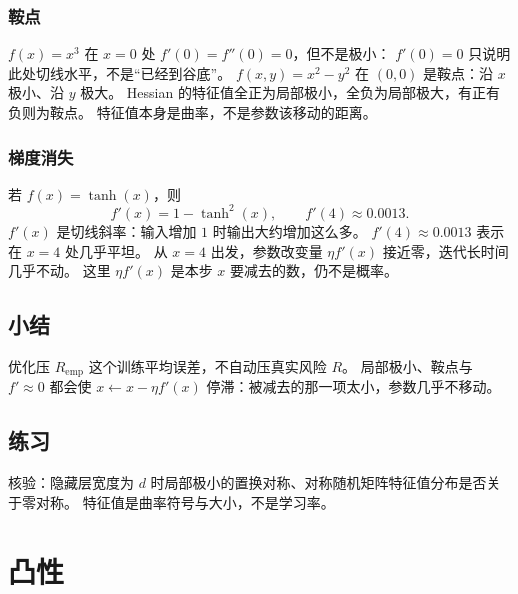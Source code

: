\subsubsection{鞍点}

$f(x)=x^3$ 在 $x=0$ 处 $f'(0)=f''(0)=0$，但不是极小：
$f'(0)=0$ 只说明此处切线水平，不是“已经到谷底”。
$f(x,y)=x^2-y^2$ 在 $(0,0)$ 是鞍点：沿 $x$ 极小、沿 $y$ 极大。
Hessian 的特征值全正为局部极小，全负为局部极大，有正有负则为鞍点。
特征值本身是曲率，不是参数该移动的距离。

\subsubsection{梯度消失}

若 $f(x)=\tanh(x)$，则
\[
f'(x)=1-\tanh^2(x),\qquad f'(4)\approx 0.0013.
\]
$f'(x)$ 是切线斜率：输入增加 $1$ 时输出大约增加这么多。
$f'(4)\approx 0.0013$ 表示在 $x=4$ 处几乎平坦。
从 $x=4$ 出发，参数改变量 $\eta f'(x)$ 接近零，迭代长时间几乎不动。
这里 $\eta f'(x)$ 是本步 $x$ 要减去的数，仍不是概率。

\subsection{小结}

优化压 $R_{\mathrm{emp}}$ 这个训练平均误差，不自动压真实风险 $R$。
局部极小、鞍点与 $f'\approx 0$ 都会使
$x\leftarrow x-\eta f'(x)$ 停滞：被减去的那一项太小，参数几乎不移动。

\subsection{练习}

核验：隐藏层宽度为 $d$ 时局部极小的置换对称、对称随机矩阵特征值分布是否关于零对称。
特征值是曲率符号与大小，不是学习率。

\section{凸性}




